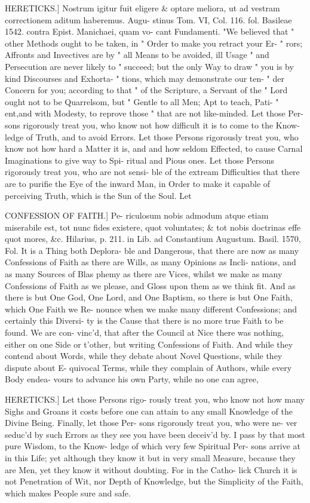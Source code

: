 HERETICKS.] Nostrum igitur fuit
eligere & optare meliora, ut ad vestram
correctionem aditum haberemus. Augu-
stinus Tom. VI, Col. 116. fol. Basileae
1542. contra Epist. Manichaei, quam vo-
cant Fundamenti. "We believed that
" other Methods ought to be taken, in
" Order to make you retract your Er-
" rors; Affronts and Invectives are by
" all Means to be avoided, ill Usage
" and Persecution are never likely to
" succeed; but the only Way to draw
" you is by kind Discourses and Exhorta-
" tions, which may demonstrate our ten-
" der Concern for you; according to that
" of the Scripture, a Servant of the
" Lord ought not to be Quarrelsom, but
" Gentle to all Men; Apt to teach, Pati-
" ent,and with Modesty, to reprove those
" that are not like-minded. Let those Per-
sons rigorously treat you, who know not
how difficult it is to come to the Know-
ledge of Truth, and to avoid Errors. Let
those Persons rigorously treat you, who
know not how hard a Matter it is, and
and how seldom Effected, to cause
Carnal Imaginations to give way to Spi-
ritual and Pious ones. Let those Persons
rigorously treat you, who are not sensi-
ble of the extream Difficulties that there
are to purifie the Eye of the inward
Man, in Order to make it capable of
perceiving Truth, which is the Sun of
the Soul. Let


CONFESSION OF FAITH.] Pe-
riculosum nobis admodum atque etiam
miserabile est, tot nunc fides existere,
quot voluntates; & tot nobis doctrinas
effe quot mores, &c. Hilarius, p. 211.
in Lib. ad Constantium Augustum. Basil.
1570, Fol. It is a Thing both Deplora-
ble and Dangerous, that there are now
as many Confessions of Faith as there
are Wills, as many Opinions as Incli-
nations, and as many Sources of Blas
phemy as there are Vices, whilst we
make as many Confessions of Faith as we
please, and Gloss upon them as we think
fit. And as there is but One God, One
Lord, and One Baptism, so there is but
One Faith, which One Faith we Re-
nounce when we make many different
Confessions; and certainly this Diversi-
ty is the Cause that there is no more
true Faith to be found. We are con-
vinc'd, that after the Council at Nice
there was nothing, either on one Side
or t'other, but writing Confessions of
Faith. And while they contend about
Words, while they debate about Novel
Questions, while they dispute about E-
quivocal Terms, while they complain
of Authors, while every Body endea-
vours to advance his own Party, while
no one can agree,


HERETICKS.] Let those Persons rigo-
rously treat you, who know not how many
Sighs and Groans it costs before one can
attain to any small Knowledge of the
Divine Being. Finally, let those Per-
sons rigorously treat you, who were ne-
ver seduc'd by such Errors as they see
you have been deceiv'd by. I pass by
that most pure Wisdom, to the Know-
ledge of which very few Spiritual Per-
sons arrive at in this Life; yet although
they know it but in very small Measure,
because they are Men, yet they know
it without doubting. For in the Catho-
lick Church it is not Penetration of
Wit, nor Depth of Knowledge, but the
Simplicity of the Faith, which makes
People sure and safe.

